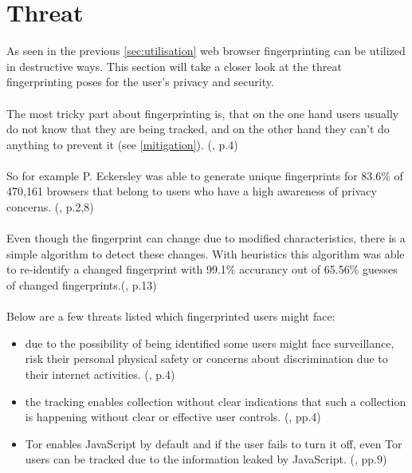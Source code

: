 \section{Threat}
As seen in the previous \autoref{sec:utilisation} web browser fingerprinting can be utilized in destructive ways. This section will take a closer look at the threat fingerprinting poses for the user's privacy and security.\\\\
The most tricky part about fingerprinting is, that on the one hand users usually do not know that they are being tracked, and on the other hand they can't do anything to prevent it (see \autoref{mitigation}). (\textcite{upi15}, p.4) \\\\
So for example P. Eckersley was able to generate unique fingerprints for 83.6\% of 470,161 browsers that belong to users who have a high awareness of privacy concerns. (\textcite{eckersley10}, p.2,8)\\\\
Even though the fingerprint can change due to modified characteristics, there is a simple algorithm to detect these changes. With heuristics this algorithm was able to re-identify a changed fingerprint with 99.1\% accurancy out of 65.56\% guesses of changed fingerprints.(\textcite{eckersley10}, p.13)\\\\
Below are a few threats listed which fingerprinted users might face:
\begin{itemize}
	\item due to the possibility of being identified some users might face surveillance, risk their personal physical safety or concerns about discrimination due to their internet activities. (\textcite{doty18}, p.4)
	\item the tracking enables collection without clear indications that such a collection is happening without clear or effective user controls. (\textcite{doty18}, pp.4)
	\item Tor enables JavaScript by default and if the user fails to turn it off, even Tor users can be tracked due to the information leaked by JavaScript. (\textcite{havens16}, pp.9)
\end{itemize}

